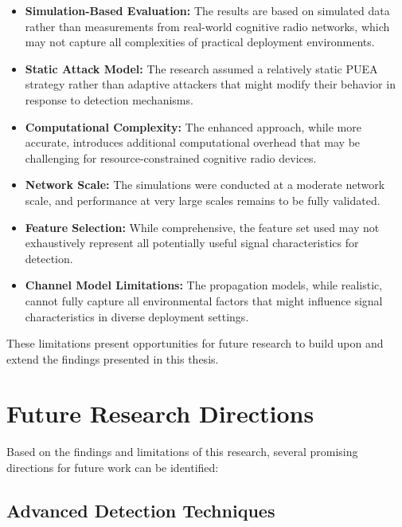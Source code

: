 \begin{itemize}
    \item \textbf{Simulation-Based Evaluation:} The results are based on simulated data rather than measurements from real-world cognitive radio networks, which may not capture all complexities of practical deployment environments.

    \item \textbf{Static Attack Model:} The research assumed a relatively static PUEA strategy rather than adaptive attackers that might modify their behavior in response to detection mechanisms.

    \item \textbf{Computational Complexity:} The enhanced approach, while more accurate, introduces additional computational overhead that may be challenging for resource-constrained cognitive radio devices.

    \item \textbf{Network Scale:} The simulations were conducted at a moderate network scale, and performance at very large scales remains to be fully validated.

    \item \textbf{Feature Selection:} While comprehensive, the feature set used may not exhaustively represent all potentially useful signal characteristics for detection.
    
    \item \textbf{Channel Model Limitations:} The propagation models, while realistic, cannot fully capture all environmental factors that might influence signal characteristics in diverse deployment settings.
\end{itemize}

These limitations present opportunities for future research to build upon and extend the findings presented in this thesis.

\section{Future Research Directions}

Based on the findings and limitations of this research, several promising directions for future work can be identified:

\subsection{Advanced Detection Techniques}

